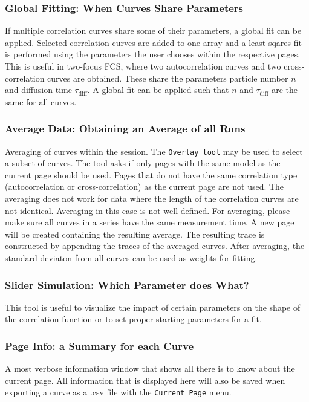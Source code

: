 \subsubsection{Global Fitting: When Curves Share Parameters}
If multiple correlation curves share some of their parameters, a global fit can be applied. Selected correlation curves are added to one array and a least-sqares fit is performed using the parameters the user chooses within the respective pages. This is useful in two-focus FCS, where two autocorrelation curves and two cross-correlation curves are obtained. These share the parameters particle number $n$ and diffusion time $\tau_{\text{diff}}$. A global fit can be applied such that $n$ and $\tau_{\text{diff}}$ are the same for all curves.


\subsubsection{Average Data: Obtaining an Average of all Runs}
Averaging of curves within the session. The \texttt{Overlay tool} may be used to select a subset of curves. The tool asks if only pages with the same model as the current page should be used. Pages that do not have the same correlation type (autocorrelation or cross-correlation) as the current page are not used. The averaging does not work for data where the length of the correlation curves are not identical. Averaging in this case is not well-defined. For averaging, please make sure all curves in a series have the same measurement time.
A new page will be created containing the resulting average. The resulting trace is constructed by appending the traces of the averaged curves. After averaging, the standard deviaton from all curves can be used as weights for fitting.


\subsubsection{Slider Simulation: Which Parameter does What?}
This tool is useful to visualize the impact of certain parameters on the shape of the correlation function or to set proper starting parameters for a fit.


\subsubsection{Page Info: a Summary for each Curve}
\label{Tool:PageInfo} A most verbose information window that shows all there is to know about the current page. All information that is displayed here will also be saved when exporting a curve as a \mytilde .csv file with the \texttt{Current Page} menu.

